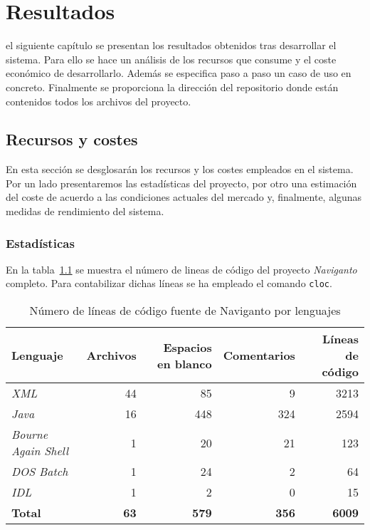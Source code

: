 \chapter{Resultados}
\label{chap:resultados}

 el siguiente capítulo se presentan los resultados obtenidos tras desarrollar el
sistema. Para ello se hace un análisis de los recursos que consume y el coste económico
de desarrollarlo. Además se especifica paso a paso un caso de uso en concreto. Finalmente se
proporciona la dirección del repositorio donde están contenidos todos los archivos del proyecto.

\section{Recursos y costes}

En esta sección se desglosarán los recursos y los costes empleados en el sistema. Por un lado
presentaremos las estadísticas del proyecto, por otro una estimación del coste de acuerdo a las
condiciones actuales del mercado y, finalmente, algunas medidas de rendimiento del sistema.

\subsection{Estadísticas}

En la tabla~\ref{cuadro:lineasCodigo} se muestra el número de lineas de código del proyecto
\emph{Naviganto} completo. Para contabilizar dichas líneas se ha empleado el comando \texttt{cloc}.

\begin{table}[h]
  \centering
  \begin{tabular}{|l|r|r|r|r|}
    \hline
    \textbf{Lenguaje} & \textbf{Archivos} & \textbf{Espacios en blanco} & \textbf{Comentarios} & 
      \textbf{Líneas de código} \\
    \hline
    \emph{XML}                &          44  &           85  &             9  &          3213  \\
    \hline
    \emph{Java}               &          16  &          448  &           324  &          2594  \\
    \hline
    \emph{Bourne Again Shell} &           1  &           20  &            21  &           123  \\
    \hline
    \emph{DOS Batch}          &           1  &           24  &             2  &            64  \\
    \hline
    \emph{IDL}                &           1  &            2  &             0  &            15  \\
    \hline
    \textbf{Total}            &  \textbf{63} &  \textbf{579} &   \textbf{356} &  \textbf{6009} \\
    \hline
  \end{tabular}
  \caption{Número de líneas de código fuente de Naviganto por lenguajes}
  \label{cuadro:lineasCodigo}
\end{table} 

